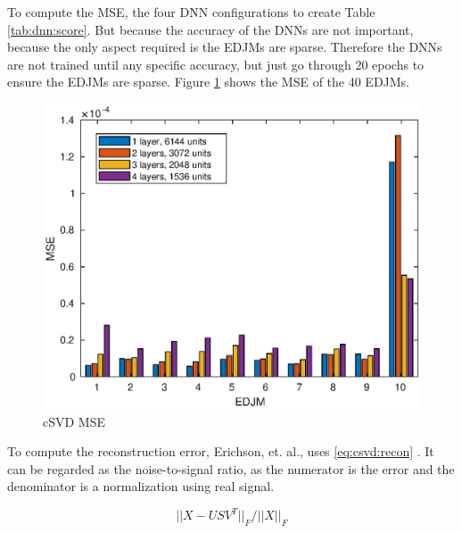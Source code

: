 To compute the MSE, the four DNN configurations to create Table \ref{tab:dnn:score}. But because the accuracy of the DNNs are not important, because the only aspect required is the EDJMs are sparse. Therefore the DNNs are not trained until any specific accuracy, but just go through 20 epochs to ensure the EDJMs are sparse. Figure \ref{fig:csvd:mse} shows the MSE of the 40 EDJMs.
  
\begin{figure}[H]
  \centering
  \includegraphics[scale=0.6]{Figures/csvd_mse.eps}
  \caption{cSVD MSE}
  \label{fig:csvd:mse}
\end{figure}

To compute the reconstruction error, Erichson, et. al., uses \eqref{eq:csvd:recon} \cite{erichson:csvd}. It can be regarded as the noise-to-signal ratio, as the numerator is the error and the denominator is a normalization using real signal.

\begin{equation}
  \label{eq:csvd:recon}
  ||X - USV^T||_F/||X||_F
\end{equation}



